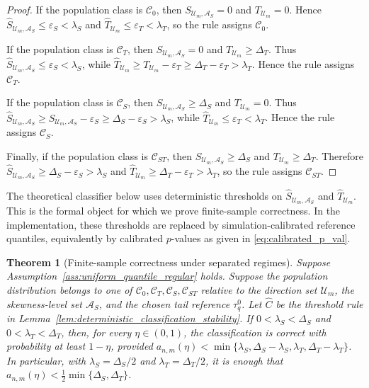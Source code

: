 \documentclass[11pt]{article}
\theoremstyle{plain}
\newtheorem{theorem}{Theorem}
\theoremstyle{definition}
\theoremstyle{remark}
\begin{document}
\begin{proof}
	If the population class is \(\mathcal C_0\), then \(S_{\mathcal U_m,\mathcal A_S}=0\) and \(T_{\mathcal U_m}=0\). Hence \(\widehat S_{\mathcal U_m,\mathcal A_S}\le\varepsilon_S<\lambda_S\) and \(\widehat T_{\mathcal U_m}\le\varepsilon_T<\lambda_T\), so the rule assigns \(\mathcal C_0\).

	If the population class is \(\mathcal C_T\), then \(S_{\mathcal U_m,\mathcal A_S}=0\) and \(T_{\mathcal U_m}\ge\Delta_T\). Thus \(\widehat S_{\mathcal U_m,\mathcal A_S}\le\varepsilon_S<\lambda_S\), while \(\widehat T_{\mathcal U_m}\geqslant T_{\mathcal U_m}-\varepsilon_T\ge\Delta_T-\varepsilon_T>\lambda_T\). Hence the rule assigns \(\mathcal C_T\).

	If the population class is \(\mathcal C_S\), then \(S_{\mathcal U_m,\mathcal A_S}\ge\Delta_S\) and \(T_{\mathcal U_m}=0\). Thus \(\widehat S_{\mathcal U_m,\mathcal A_S}\geqslant S_{\mathcal U_m,\mathcal A_S}-\varepsilon_S\ge\Delta_S-\varepsilon_S>\lambda_S\), while \(\widehat T_{\mathcal U_m}\le\varepsilon_T<\lambda_T\). Hence the rule assigns \(\mathcal C_S\).

	Finally, if the population class is \(\mathcal C_{ST}\), then \(S_{\mathcal U_m,\mathcal A_S}\ge\Delta_S\) and \(T_{\mathcal U_m}\ge\Delta_T\). Therefore \(\widehat S_{\mathcal U_m,\mathcal A_S}\ge\Delta_S-\varepsilon_S>\lambda_S\) and \(\widehat T_{\mathcal U_m}\ge\Delta_T-\varepsilon_T>\lambda_T\), so the rule assigns \(\mathcal C_{ST}\).
\end{proof}

The theoretical classifier below uses deterministic thresholds on \(\widehat S_{\mathcal U_m,\mathcal A_S}\) and \(\widehat T_{\mathcal U_m}\). This is the formal object for which we prove finite-sample correctness. In the implementation, these thresholds are replaced by simulation-calibrated reference quantiles, equivalently by calibrated \(p\)-values as given in \eqref{eq:calibrated_p_val}.

\begin{theorem}[Finite-sample correctness under separated regimes]
	\label{thm:finite_sample_four_regime}
	Suppose Assumption~\ref{ass:uniform_quantile_regular} holds. Suppose the population distribution belongs to one of \(\mathcal C_0,\mathcal C_T,\mathcal C_S,\mathcal C_{ST}\) relative to the direction set \(\mathcal U_m\), the skewness-level set \(\mathcal A_S\), and the chosen tail reference \(\tau_q^0\). Let \(\widehat C\) be the threshold rule in Lemma~\ref{lem:deterministic_classification_stability}. If \(0<\lambda_S<\Delta_S\) and \(0<\lambda_T<\Delta_T\), then, for every \(\eta\in(0,1)\), the classification is correct with probability at least \(1-\eta\), provided \(a_{n,m}(\eta)<\min\{\lambda_S,\Delta_S-\lambda_S,\lambda_T,\Delta_T-\lambda_T\}\). In particular, with \(\lambda_S=\Delta_S/2\) and \(\lambda_T=\Delta_T/2\), it is enough that \(a_{n,m}(\eta)<\frac12\min\{\Delta_S,\Delta_T\}\).
\end{theorem}
\end{document}
